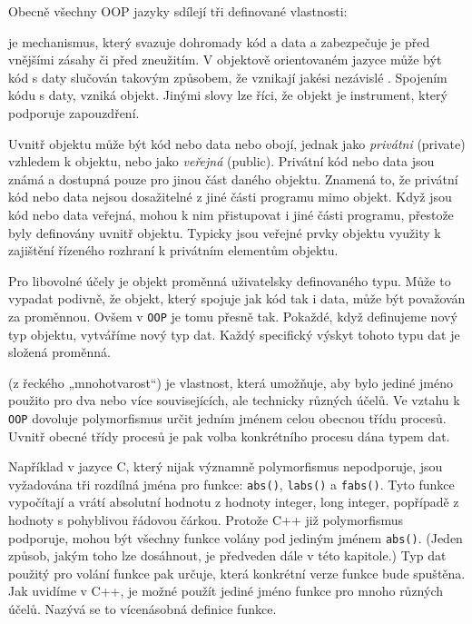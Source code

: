       Obecně všechny OOP jazyky sdílejí tři definované vlastnosti:

      \noindent{}

      \begin{description}[noitemsep]
        \item[\textbf{Zapouzdření}:] je mechanismus, který svazuje dohromady kód a data a
          zabezpečuje je před vnějšími zásahy či před zneužitím. V objektově orientovaném jazyce
          může být kód s daty slučován takovým způsobem, že vznikají jakési nezávislé . Spojením kódu s daty, vzniká objekt. Jinými slovy lze říci, že objekt je
          instrument, který podporuje zapouzdření.

          Uvnitř objektu může být kód nebo data nebo obojí, jednak jako \emph{privátni} (private)
          vzhledem k objektu, nebo jako \emph{veřejná} (public). Privátní kód nebo data jsou známá a
          dostupná pouze pro jinou část daného objektu. Znamená to, že privátní kód nebo data nejsou
          dosažitelné z jiné části programu mimo objekt. Když jsou kód nebo data veřejná, mohou k
          nim přistupovat i jiné části programu, přestože byly definovány uvnitř objektu. Typicky
          jsou veřejné prvky objektu využity k zajištění řízeného rozhraní k privátním elementům
          objektu.
          
          Pro libovolné účely je objekt proměnná uživatelsky definovaného typu. Může to vypadat
          podivně, že objekt, který spojuje jak kód tak i data, může být považován za proměnnou.
          Ovšem v \texttt{OOP} je tomu přesně tak. Pokaždé, když definujeme nový typ objektu,
          vytváříme nový typ dat. Každý specifický výskyt tohoto typu dat je složená proměnná.

        \item[\textbf{Polymorfismus}:] (z řeckého „mnohotvarost“) je vlastnost, která umožňuje, aby
          bylo jediné jméno použito pro dva nebo více souvisejících, ale technicky různých účelů. Ve
          vztahu k \texttt{OOP} dovoluje polymorfismus určit jedním jménem celou obecnou třídu
          procesů. Uvnitř obecné třídy procesů je pak volba konkrétního procesu dána typem dat. 

          Například v jazyce C, který nijak významně polymorfismus nepodporuje, jsou vyžadována tři
          rozdílná jména pro funkce: \lstinline[style=luaCPPText]!abs()!,
          \lstinline[style=luaCPPText]!labs()! a \lstinline[style=luaCPPText]!fabs()!. Tyto funkce
          vypočítají a vrátí absolutní hodnotu z hodnoty integer, long integer, popřípadě z hodnoty
          s pohyblivou řádovou čárkou. Protože C++ již polymorfismus podporuje, mohou být všechny
          funkce volány pod jediným jménem \lstinline[style=luaCPPText]!abs()!. (Jeden způsob, jakým
          toho lze dosáhnout, je předveden dále v této kapitole.) Typ dat použitý pro volání funkce
          pak určuje, která konkrétní verze funkce bude spuštěna. Jak uvidíme v C++, je možné použít
          jediné jméno funkce pro mnoho různých účelů. Nazývá se to vícenásobná definice funkce.


\end{description}
